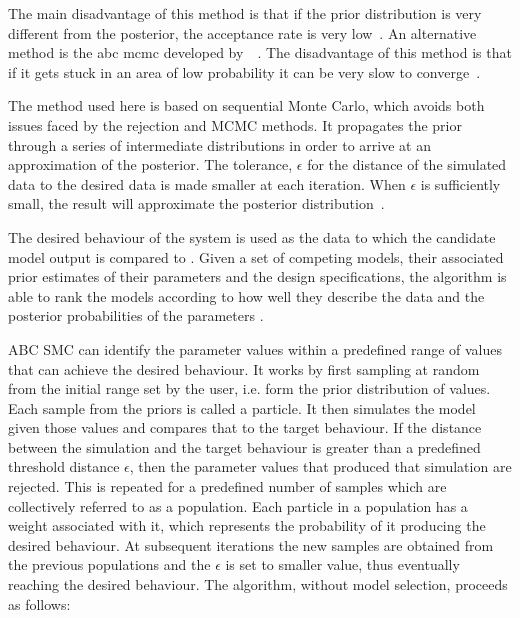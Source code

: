 \noindent The main disadvantage of this method is that if the prior distribution is very different from the posterior, the acceptance rate is very low~\autocite{Toni:2009tr}. An alternative method is the \acrshort{abc} \acrfull{mcmc} developed by~\textcite{Marjoram:2003up}~\autocite{Marjoram:2003up}. The disadvantage of this method is that if it gets stuck in an area of low probability it can be very slow to converge~\autocite{Sisson:wf}. 

The method used here is based on sequential Monte Carlo, which avoids both issues faced by the rejection and MCMC methods. It propagates the prior through a series of intermediate distributions in order to arrive at an approximation of the posterior. The tolerance, $\epsilon$ for the distance of the simulated data to the desired data is made smaller at each iteration. When $\epsilon$ is sufficiently small, the result will approximate the posterior distribution~\autocite{Toni:2009tr}.  

The desired behaviour of the system is used as the data to which the candidate model output is compared to \cite{Barnes:2011hh}. Given a set of competing models, their associated prior estimates of their parameters and the design specifications, the algorithm is able to rank the models according to how well they describe the data and the posterior probabilities of the parameters \cite{Barnes:2011hh}. 

ABC SMC can identify the parameter values within a predefined range of values that can achieve the desired behaviour. It works by first sampling at random from the initial range set by the user, i.e. form the prior distribution of values. Each sample from the priors is called a particle. It then simulates the model given those values and compares that to the target behaviour. If the distance between the simulation and the target behaviour is greater than a predefined threshold distance $\epsilon$, then the parameter values that produced that simulation are rejected. This is repeated for a predefined number of samples which are collectively referred to as a population. Each particle in a population has a weight associated with it, which represents the probability of it producing the desired behaviour. At subsequent iterations the new samples are obtained from the previous populations and the $\epsilon$ is set to smaller value, thus eventually reaching the desired behaviour. The algorithm, without model selection, proceeds as follows:

